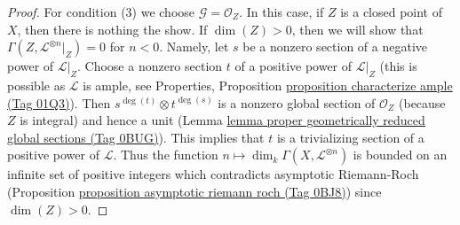 \documentclass{amsart}
\theoremstyle{plain}
\theoremstyle{definition}
\theoremstyle{remark}
\numberwithin{equation}{subsection}
\begin{document}
\begin{proof}
\medskip\noindent
For condition (3) we choose $\mathcal{G} = \mathcal{O}_Z$.
In this case, if $Z$ is a closed point of $X$, then there is
nothing the show. If $\dim(Z) > 0$, then we will show that
$\Gamma(Z, \mathcal{L}^{\otimes n}|_Z) = 0$
for $n < 0$. Namely, let $s$ be a nonzero section of a negative
power of $\mathcal{L}|_Z$. Choose a nonzero section $t$ of a positive
power of $\mathcal{L}|_Z$ (this is possible as $\mathcal{L}$ is ample, see
Properties, Proposition \href{https://stacks.math.columbia.edu/tag/01Q3}{proposition characterize ample (Tag 01Q3)}).
Then $s^{\deg(t)} \otimes t^{\deg(s)}$
is a nonzero global section of $\mathcal{O}_Z$
(because $Z$ is integral) and hence
a unit (Lemma \href{https://stacks.math.columbia.edu/tag/0BUG}{lemma proper geometrically reduced global sections (Tag 0BUG)}).
This implies that $t$ is a trivializing section
of a positive power of $\mathcal{L}$.
Thus the function $n \mapsto \dim_k \Gamma(X, \mathcal{L}^{\otimes n})$
is bounded on an infinite set of positive integers which contradicts
asymptotic Riemann-Roch
(Proposition \href{https://stacks.math.columbia.edu/tag/0BJ8}{proposition asymptotic riemann roch (Tag 0BJ8)})
since $\dim(Z) > 0$.
\end{proof}
\end{document}
